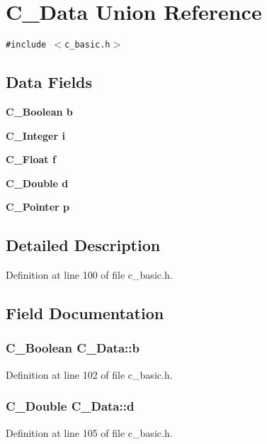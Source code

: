 \section{C\_\-Data Union Reference}
\label{unionC__Data}
{\tt \#include $<$c\_\-basic.h$>$}

\subsection*{Data Fields}
\begin{CompactItemize}
\item 
\bf{C\_\-Boolean} \bf{b}
\item 
\bf{C\_\-Integer} \bf{i}
\item 
\bf{C\_\-Float} \bf{f}
\item 
\bf{C\_\-Double} \bf{d}
\item 
\bf{C\_\-Pointer} \bf{p}
\end{CompactItemize}


\subsection{Detailed Description}




Definition at line 100 of file c\_\-basic.h.

\subsection{Field Documentation}
\subsubsection{\setlength{\rightskip}{0pt plus 5cm}\bf{C\_\-Boolean} \bf{C\_\-Data::b}}\label{unionC__Data_d4af83d1fe8e54f3dcb0ac4e768b843d}




Definition at line 102 of file c\_\-basic.h.
\subsubsection{\setlength{\rightskip}{0pt plus 5cm}\bf{C\_\-Double} \bf{C\_\-Data::d}}\label{unionC__Data_0a321ab195a94fb73b4e0ed16eaa56c8}




Definition at line 105 of file c\_\-basic.h.
